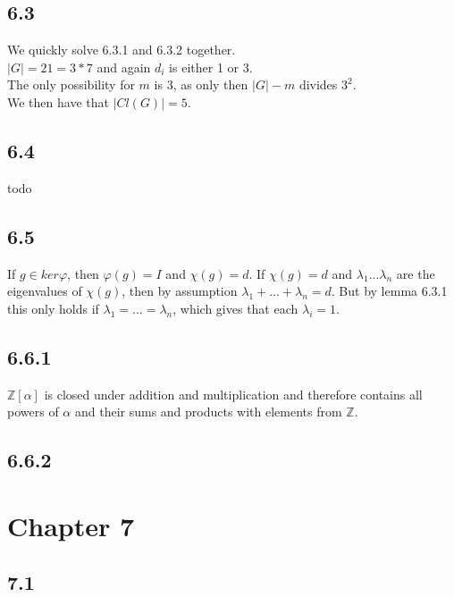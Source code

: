 \documentclass[12pt]{article}
\begin{document}
\subsection*{6.3}

We quickly solve 6.3.1 and 6.3.2 together.\\
$|G| = 21 = 3*7$ and again $d_i$ is either 1 or 3.\\
The only possibility for $m$ is 3, as only then $|G| - m$ divides $3^2$.\\
We then have that $|Cl(G)| = 5$.

\subsection*{6.4}

todo

\subsection*{6.5}

If $g \in ker \varphi$, then $\varphi(g) = I$ and $\chi(g) = d$.
If $\chi(g) = d$ and $\lambda_1 ... \lambda_n$ are the eigenvalues of $\chi(g)$, then by assumption $\lambda_1 + ... + \lambda_n = d$. But by lemma 6.3.1 this only holds if $\lambda_1 = ... = \lambda_n$, which gives that each $\lambda_i = 1$.

\subsection*{6.6.1}

$\mathbb{Z}[\alpha]$ is closed under addition and multiplication and therefore contains all powers of $\alpha$ and their sums and products with elements from $\mathbb{Z}$.

\subsection*{6.6.2}



\pagebreak

\section*{Chapter 7}

\subsection*{7.1}
\end{document}
